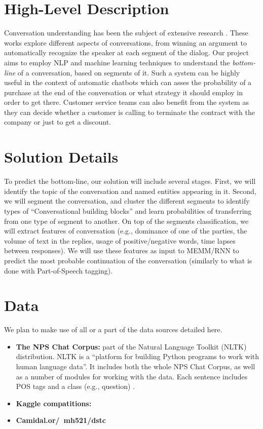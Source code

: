 \section{High-Level Description}
Conversation understanding has been the subject of 
extensive research \cite{...}. These works explore 
different aspects of conversations, from winning an argument 
to automatically recognize the speaker at each segment of the dialog. 
Our project aims to employ NLP and machine learning techniques to 
understand the {\em bottom-line} of a conversation, based on segments 
of it. Such a system can be highly useful in the context of automatic 
chatbots which can asses the probability of a purchase at the end of 
the conversation or what strategy it should employ in order to get there. 
Customer service teams can also benefit from the system as they can decide 
whether a customer is calling to terminate the contract with the company 
or just to get a discount. 

\section{Solution Details}
To predict the bottom-line, our solution will include several stages. 
First, we will identify the topic of the conversation and named entities 
appearing in it. Second, we will segment the conversation, 
and cluster the different segments to identify types of 
``Conversational building blocks'' and learn probabilities 
of transferring from one type of segment to another. 
On top of the segments classification, we will extract features of 
conversation (e.g., dominance of one of the parties, 
the volume of text in the replies, usage of positive/negative words, 
time lapses between responses). 
We will use these features as input to MEMM/RNN to predict the 
most probable continuation of the conversation 
(similarly to what is done with Part-of-Speech tagging). 


\section{Data}
We plan to make use of all or a part of the data sources detailed here. 
\begin{itemize}
	\item {\bf The NPS Chat Corpus:} part of the Natural Language Toolkit (NLTK) distribution. 
	NLTK is a ``platform for building Python programs to work with human language data''. 
	It includes both the whole NPS Chat Corpus, as well as a number of modules for working with the data. 
	Each sentence includes POS tags and a class (e.g., question) \cite{NPS}.

	\item {\bf Kaggle compatitions: }

	\item {\bf Camidal.or/~mh521/dstc}
\end{itemize}
